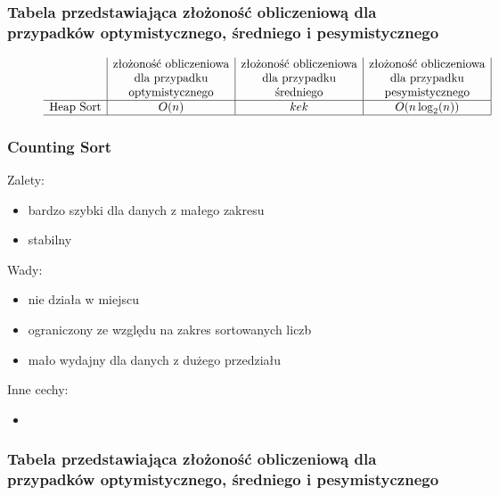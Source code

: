 \documentclass[polish,polish,a4paper]{article}
\begin{document}
\begin{spacing}{1.5}
\subsubsection*{Tabela przedstawiająca złożoność obliczeniową dla przypadków optymistycznego, średniego i pesymistycznego} 
\begin{figure}[H]
	
	\begin{equation*}
	\begin{array}{l|c|c|c|}

	&$złożoność obliczeniowa$&$złożoność obliczeniowa$&$złożoność obliczeniowa$\\
	&$dla przypadku$&$dla przypadku$&$dla przypadku$\\
	&$optymistycznego$&$średniego$&$pesymistycznego$\\
	\hline
	$Heap Sort$&O(n)&kek&O(n\log_{2}(n))\\
	\hline
	\end{array}
	\end{equation*}
\end{figure}

			\subsubsection*{Counting Sort}
Zalety:
\begin{itemize}
	\item bardzo szybki dla danych z małego zakresu
	\item stabilny
\end{itemize}
Wady:
\begin{itemize}
	\item nie działa w miejscu
	\item ograniczony ze względu na zakres sortowanych liczb
	\item mało wydajny dla danych z dużego przedziału
\end{itemize}
Inne cechy:
\begin{itemize}
	\item 
\end{itemize}

\subsubsection*{Tabela przedstawiająca złożoność obliczeniową dla przypadków optymistycznego, średniego i pesymistycznego} 
\begin{figure}[H]
	

\end{figure}
\end{spacing}
\end{document}
